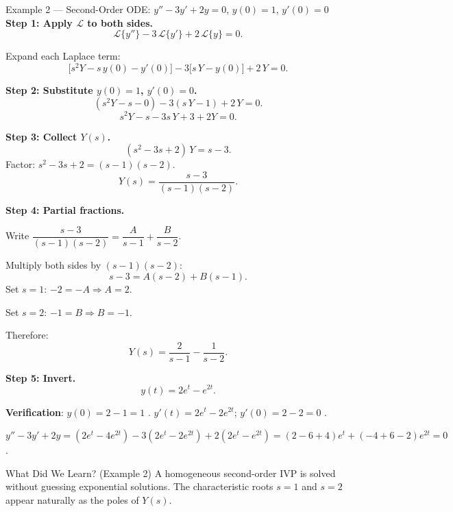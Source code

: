 \documentclass[12pt,a4paper]{article}
\begin{document}
\begin{infobox}{Example 2 --- Second-Order ODE: $y'' - 3y' + 2y = 0$, $y(0)=1$, $y'(0)=0$}
\textbf{Step 1: Apply $\mathcal{L}$ to both sides.}
\[
  \mathcal{L}\{y''\} - 3\,\mathcal{L}\{y'\} + 2\,\mathcal{L}\{y\} = 0.
\]

Expand each Laplace term:
\[
  \bigl[s^2 Y - s\,y(0) - y'(0)\bigr]
  - 3\bigl[s\,Y - y(0)\bigr]
  + 2\,Y = 0.
\]

\textbf{Step 2: Substitute $y(0)=1$, $y'(0)=0$.}
\[
  (s^2 Y - s - 0) - 3(s\,Y - 1) + 2\,Y = 0.
\]
\[
  s^2 Y - s - 3s\,Y + 3 + 2Y = 0.
\]

\textbf{Step 3: Collect $Y(s)$.}
\[
  (s^2 - 3s + 2)\,Y = s - 3.
\]
Factor: $s^2 - 3s + 2 = (s-1)(s-2)$.
\[
  Y(s) = \frac{s-3}{(s-1)(s-2)}.
\]

\textbf{Step 4: Partial fractions.}

Write $\dfrac{s-3}{(s-1)(s-2)} = \dfrac{A}{s-1} + \dfrac{B}{s-2}$.

Multiply both sides by $(s-1)(s-2)$:
\[
  s - 3 = A(s-2) + B(s-1).
\]
Set $s=1$: $-2 = -A \Rightarrow A = 2$.

Set $s=2$: $-1 = B \Rightarrow B = -1$.

Therefore:
\[
  Y(s) = \frac{2}{s-1} - \frac{1}{s-2}.
\]

\textbf{Step 5: Invert.}
\[
  y(t) = 2e^{t} - e^{2t}.
\]

\textbf{Verification}: $y(0) = 2-1 = 1$ \checkmark.
$y'(t) = 2e^t - 2e^{2t}$; $y'(0) = 2 - 2 = 0$ \checkmark.

$y'' - 3y' + 2y
 = (2e^t - 4e^{2t}) - 3(2e^t - 2e^{2t}) + 2(2e^t - e^{2t})
 = (2 - 6 + 4)e^t + (-4+6-2)e^{2t} = 0$ \checkmark.
\end{infobox}

\begin{learnbox}{What Did We Learn? (Example 2)}
A homogeneous second-order IVP is solved without guessing exponential
solutions. The characteristic roots $s=1$ and $s=2$ appear naturally as
the poles of $Y(s)$.
\end{learnbox}
\end{document}
